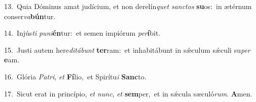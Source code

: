 {\numbfont\textcolor{\numbcolor}{13.}}~Quia Dóminus amat judícium, et non derelín\textit{quet} \textit{sanc}\-\textit{tos} \textbf{su}\-os:~\star in ætérnum conser\-\textit{va}\-\textbf{bún}tur.\par
{\numbfont\textcolor{\numbcolor}{14.}}~Injús\textit{ti} \textit{pu}\-\textit{ni}\textbf{én}tur:~\star et semen impiórum \textit{per}\-\textbf{í}bit.\par
{\numbfont\textcolor{\numbcolor}{15.}}~Justi autem here\-\textit{di}\-\textit{tá}\textit{bunt} \textbf{ter}\-ram:~\star et inhabitábunt in sǽculum sǽculi su\textit{per} \textbf{e}\-am.\par
{\numbfont\textcolor{\numbcolor}{16.}}~Glória \textit{Pa}\-\textit{tri}, \textit{et} \textbf{Fí}\-lio,~\star et Spirítu\textit{i} \textbf{Sanc}\-to.\par
{\numbfont\textcolor{\numbcolor}{17.}}~Sicut erat in princípio, \textit{et} \textit{nunc}\-, \textit{et} \textbf{sem}\-per,~\star et in sǽcula sæculó\-\textit{rum}\-. \textbf{A}\-men.\par
